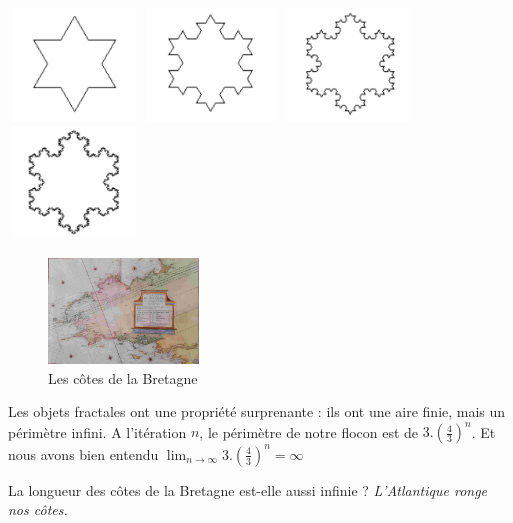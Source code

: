 \documentclass[11pt]{book}
\begin{document}
\includegraphics[width=3.5cm, height=3cm]{flocon1.pdf}
\includegraphics[width=3.5cm, height=3cm]{flocon2.pdf}
\includegraphics[width=3.5cm, height=3cm]{flocon3.pdf}
\includegraphics[width=3.5cm, height=3cm]{flocon4.pdf}


\begin{figure}[H]
	\centering
	\caption{Les côtes de la Bretagne}
	\includegraphics[width=4.0cm]{bretagne3.jpg}
\end{figure}

Les objets fractales ont une propriété surprenante : ils ont une aire finie, mais un périmètre infini.
A l'itération $n$, le périmètre de notre flocon est de $3.(\frac{4}{3})^n$. Et nous avons bien entendu 
$\lim_{n \rightarrow \infty} 3.(\frac{4}{3})^n =\infty $


La longueur des côtes de la Bretagne est-elle aussi infinie ?
\textit{L'Atlantique ronge nos côtes.} \cite{vh}
\end{document}
